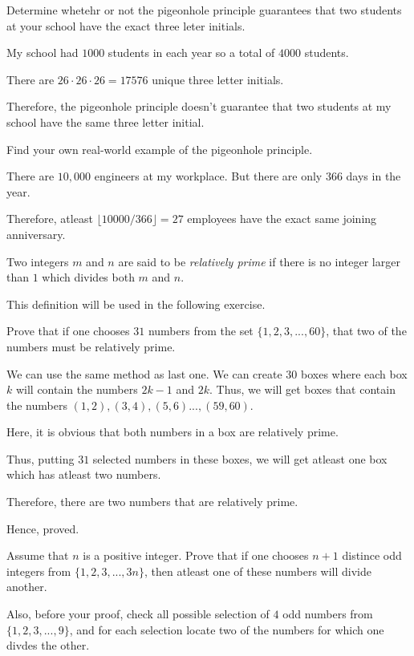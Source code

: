 \bp 
	Determine whetehr or not the pigeonhole principle guarantees that two students at your school have the exact three leter initials.
\ep 

\bs
	My school had $1000$ students in each year so a total of $4000$ students.

	There are $26 \cdot 26 \cdot 26 = 17576$ unique three letter initials.

	Therefore, the pigeonhole principle doesn't guarantee that two students at my school have the same three letter initial.
\es


\bp 
	Find your own real-world example of the pigeonhole principle.
\ep 

\bs
	There are $10,000$ engineers at my workplace. But there are only $366$ days in the year. 

	Therefore, atleast $\lfloor 10000/366 \rfloor = 27$ employees have the exact same joining anniversary.
\es

\begin{named}[Definition]
	Two integers $m$ and $n$ are said to be \emph{relatively prime} if there is no integer larger than $1$ which divides both $m$ and $n$.
\end{named}

This definition will be used in the following exercise.

\bp 
Prove that if one chooses $31$ numbers from the set $\{1,2,3,...,60\}$, 
that two of the numbers must be relatively prime.
\ep 

\bs
	We can use the same method as last one. We can create $30$ boxes where each box $k$ will contain the numbers $2k-1$ and $2k$. Thus, we will get boxes that contain the numbers $(1, 2), (3, 4), (5, 6) ..., (59, 60)$. 

	Here, it is obvious that both numbers in a box are relatively prime.

	Thus, putting $31$ selected numbers in these boxes, we will get atleast one box which has atleast two numbers.

	Therefore, there are two numbers that are relatively prime.

	Hence, proved.
\es

\bp 
	Assume that $n$ is a positive integer. Prove that if one chooses $n+1$ distince odd integers from $\{1, 2, 3, ..., 3n\}$, then atleast one of these numbers will divide another.

	Also, before your proof, check all possible selection of $4$ odd numbers from $\{1, 2, 3, ..., 9\}$, and for each selection locate two of the numbers for which one divdes the other.
\ep 

